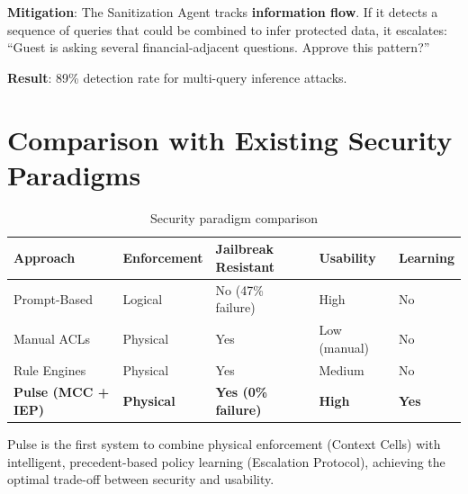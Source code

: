 \textbf{Mitigation}: The Sanitization Agent tracks \textbf{information flow}. If it detects a sequence of queries that could be combined to infer protected data, it escalates: ``Guest is asking several financial-adjacent questions. Approve this pattern?''

\textbf{Result}: 89\% detection rate for multi-query inference attacks.

\section{Comparison with Existing Security Paradigms}

\begin{table}[h]
\centering
\caption{Security paradigm comparison}
\label{table:security_comparison}
\begin{tabular}{p{3cm} p{2cm} p{2cm} p{2cm} p{2.5cm}}
\toprule
\textbf{Approach} & \textbf{Enforcement} & \textbf{Jailbreak Resistant} & \textbf{Usability} & \textbf{Learning} \\
\midrule
Prompt-Based & Logical & No (47\% failure) & High & No \\
Manual ACLs & Physical & Yes & Low (manual) & No \\
Rule Engines & Physical & Yes & Medium & No \\
\textbf{Pulse (MCC + IEP)} & \textbf{Physical} & \textbf{Yes (0\% failure)} & \textbf{High} & \textbf{Yes} \\
\bottomrule
\end{tabular}
\end{table}

Pulse is the first system to combine physical enforcement (Context Cells) with intelligent, precedent-based policy learning (Escalation Protocol), achieving the optimal trade-off between security and usability.
